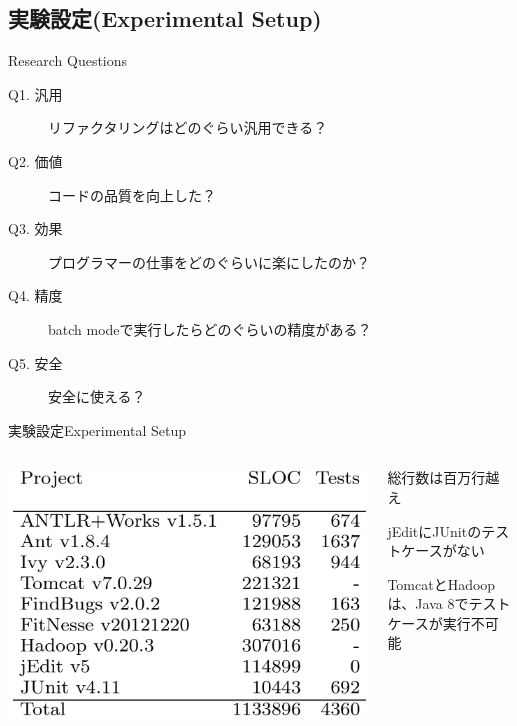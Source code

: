 \subsection{実験設定(Experimental Setup)}
\begin{frame}{Research Questions}
\begin{description}
\item[Q1. 汎用] リファクタリングはどのぐらい汎用できる？
\item[Q2. 価値] コードの品質を向上した？
\item[Q3. 効果] プログラマーの仕事をどのぐらいに楽にしたのか？
\item[Q4. 精度] batch modeで実行したらどのぐらいの精度がある？
\item[Q5. 安全] 安全に使える？
\end{description}
\end{frame}
\begin{frame}{実験設定}{Experimental Setup}
\begin{columns}
\begin{column}{0.7\textwidth}
\includegraphics[width=\textwidth,height=.8\textheight,keepaspectratio]{target}
\end{column}
\begin{column}{0.3\textwidth}
  \pause 総行数は百万行越え

  \pause jEditにJUnitのテストケースがない

  \pause TomcatとHadoopは、Java 8でテストケースが実行不可能
\end{column}
\end{columns}
\end{frame}
